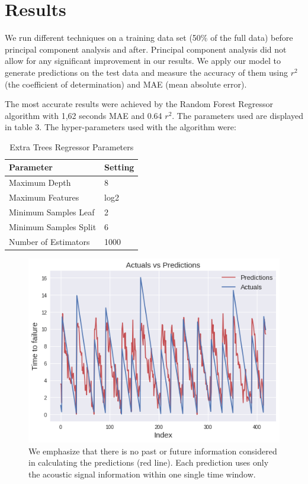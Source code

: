 \documentclass[]{llncs} %
\begin{document}
\section{Results}
We run different techniques on a training data set (50\% of the full data) before principal component analysis and after. Principal component analysis did not allow for any significant improvement in our results. We apply our model to generate predictions on the test data  and measure the accuracy of them using $r^2$ (the coefficient of determination) and MAE (mean absolute error). \par 

The most accurate results were achieved by the Random Forest Regressor algorithm with 1,62 seconds MAE and 0.64 $r^2$. The parameters used are displayed in table 3. %
The hyper-parameters used with the algorithm  were:

\begin{table}
	\begin{center}
		\caption{Extra Trees Regressor Parameters}
		\label{tab:hyperparameters}
		\begin{tabular}{l|l} 
			\textbf{Parameter} & \textbf{Setting}\\
			\hline
			Maximum Depth & 8 \\ 
			Maximum Features & log2 \\ 
			Minimum Samples Leaf & 2 \\ 
			Minimum Samples Split & 6 \\ 
			Number of Estimators & 1000 \\
		\end{tabular}
	\end{center}
\end{table}

\par

\begin{figure}
	\centering
	\includegraphics[width=.9\linewidth]{results1}
	\caption{We emphasize that there is no past or future information considered in calculating the predictions (red line). Each prediction uses only the acoustic signal information within one single time window.}
	\label{fig:results1}
\end{figure}
\end{document}
